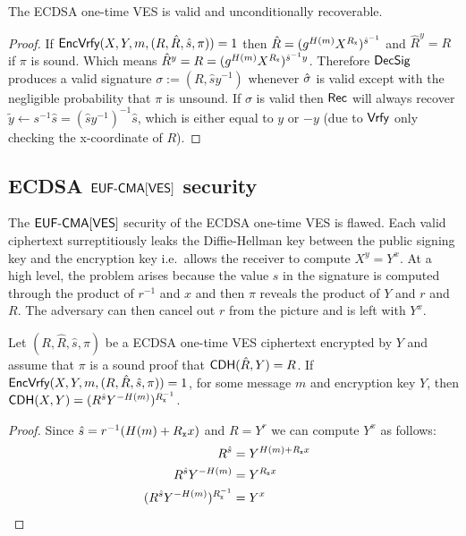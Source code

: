 \begin{lemma}
The ECDSA one-time VES is valid and unconditionally recoverable.
\end{lemma}
\begin{proof}
If $\textsf{EncVrfy}(X,Y,m,(R, \hat{R},\hat{s}, \pi)) = 1$ then $\hat{R} = (g^{H(m)}X^{R_{\mathtt{x}}})^{\hat{s}^{-1}}$ and $\hat{R}^y = R$ if $\pi$ is sound. Which means $\hat{R}^{y} = R = (g^{H(m)}X^{R_{\mathtt{x}}})^{\hat{s}^{-1}y}$. Therefore $\textsf{DecSig}$ produces a valid signature $\sigma := (R, \hat{s}y^{-1})$ whenever $\hat{\sigma}$ is valid except with the negligible probability that $\pi$ is unsound. If $\sigma$ is valid then $\textsf{Rec}$ will always recover $\tilde{y} \gets s^{-1}\hat{s} = (\hat{s}y^{-1})^{-1}\hat{s}$, which is either equal to $y$ or $-y$ (due to $\textsf{Vrfy}$ only checking the x-coordinate of $R$).
\end{proof}


\subsection{ECDSA $\textsf{EUF-CMA}[\textsf{VES}]$ security}

The $\textsf{EUF-CMA}[\textsf{VES}]$ security of the ECDSA one-time VES is flawed.
Each valid ciphertext surreptitiously leaks the Diffie-Hellman key between the public signing key and the encryption key i.e.\ allows the receiver to compute $X^y = Y^x$.
At a high level, the problem arises because the value $s$ in the signature is computed through the product of $r^{-1}$ and $x$ and then $\pi$ reveals the product of $Y$ and $r$ and $R$.
The adversary can then cancel out $r$ from the picture and is left with $Y^x$.

\begin{lemma}
  \label{key-leak}
  Let $(R, \hat{R},\hat{s}, \pi)$ be a ECDSA one-time VES ciphertext encrypted by $Y$ and assume that $\pi$ is a sound proof that $\textsf{CDH}(\hat{R},Y) = R$.
  If $\textsf{EncVrfy}(X,Y,m,(R, \hat{R},\hat{s}, \pi)) = 1$, for some message $m$ and encryption key $Y$, then $\textsf{CDH}(X,Y) = (R^{\hat{s}}Y^{-H(m)})^{R_{\mathtt{x}}^{-1}}$.
\end{lemma}
\begin{proof}
  Since $\hat{s} = r^{-1}(H(m) + R_{\mathtt{x}}{}x)$ and $R = Y^r$ we can compute $Y^x$ as follows:
  \begin{align*}
    R^{\hat{s}} & = Y^{H(m) + R_{\mathtt{x}}{}x} &  \\
    R^{\hat{s}}Y^{-H(m)} & =  Y^{R_{\mathtt{x}}{}x} \\
    (R^{\hat{s}}Y^{-H(m)})^{R_{\mathtt{x}}^{-1}} & = Y^{x}
  \end{align*}
\end{proof}


